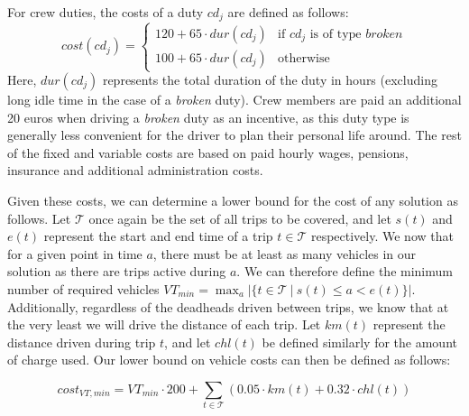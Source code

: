 \documentclass[]{article}
\begin{document}
For crew duties, the costs of a duty $cd_j$ are defined as follows:
\begin{equation}
  cost(cd_j) =
  \begin{cases}
    120 + 65 \cdot dur(cd_j) & \text{if } cd_j \text{ is of type }\textit{broken} \\ 
    100 + 65 \cdot dur(cd_j) & \text{otherwise}
  \end{cases}
\end{equation}
Here, $dur(cd_j)$ represents the total duration of the duty in hours (excluding long idle time in the case of a \textit{broken} duty). Crew members are paid an additional 20 euros when driving a \textit{broken} duty as an incentive, as this duty type is generally less convenient for the driver to plan their personal life around. The rest of the fixed and variable costs are based on paid hourly wages, pensions, insurance and additional administration costs.

Given these costs, we can determine a lower bound for the cost of any solution as follows. Let $\mathcal{T}$ once again be the set of all trips to be covered, and let $s(t)$ and $e(t)$ represent the start and end time of a trip $t \in \mathcal{T}$ respectively. We now that for a given point in time $a$, there must be at least as many vehicles in our solution as there are trips active during $a$. We can therefore define the minimum number of required vehicles $VT_{min} = \max_{a} |\{ t \in \mathcal{T} \:|\: s(t) \leq a < e(t) \}|$. Additionally, regardless of the deadheads driven between trips, we know that at the very least we will drive the distance of each trip. Let $km(t)$ represent the distance driven during trip $t$, and let $chl(t)$ be defined similarly for the amount of charge used. Our lower bound on vehicle costs can then be defined as follows: 

\begin{equation}
  cost_{VT,min} = VT_{min} \cdot 200 + \sum_{t \in \mathcal{T}} (0.05 \cdot km(t) + 0.32 \cdot chl(t)) \nonumber
\end{equation}
\end{document}
